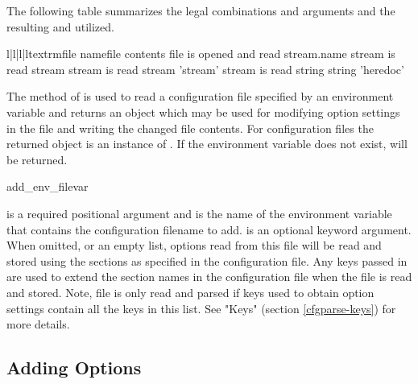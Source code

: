 \documentclass{howto}
\begin{document}
The following table summarizes the legal combinations  and
 arguments and the resulting  and 
 utilized.

\begin{tableiv}{l|l|l|l}{textrm}{}{}{file name}{file contents}
    {} {} {file is opened and read}
      {} {stream.name}   {stream is read}
    {stream}      {} {stream is read}
 {stream}      {'stream'}      {stream is read}
    {string}      {} {}
 {string}      {'heredoc'}     {}
\end{tableiv}

The  method of  is used to read a
configuration file specified by an environment variable and returns
an object which may be used for modifying option settings in the 
file and writing the changed file contents.  For  configuration 
files the returned object is an instance of .  If the
environment variable does not exist,  will be returned.
  
  \begin{funcdesc}{add_env_file}{var}

     is a required positional argument and is the name of the 
        environment variable that contains the configuration filename to
        add.  
     is an optional keyword argument.  When omitted,  
        or an empty list, options read from this file will be
        read and stored using the sections as specified in the configuration
        file.  Any keys passed in are used to extend the section names in the
        configuration file when the file is read and stored.  Note, file is
        only read and parsed if keys used to obtain option settings contain 
        all the keys in this list.  See "Keys" (section 
        \ref{cfgparse-keys}) for more details.
  \end{funcdesc}

\subsection{Adding Options\label{cfgparse-adding-options}}
\end{document}
